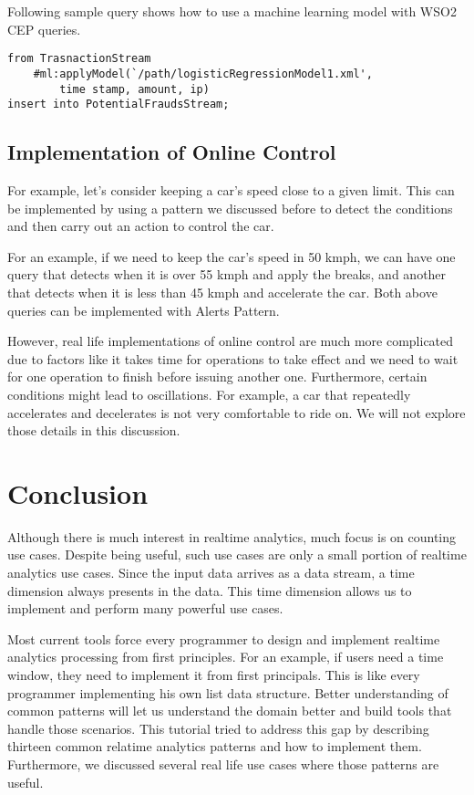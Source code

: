 \documentclass{sig-alternate}
\begin{document}
{Following sample query shows how to use a machine learning model with WSO2 CEP queries.


\begin{lstlisting}[mathescape, showstringspaces=false]
from TrasnactionStream
	#ml:applyModel(`/path/logisticRegressionModel1.xml',  
		time stamp, amount, ip) 
insert into PotentialFraudsStream;
\end{lstlisting} 

\subsection{Implementation of Online Control} 

For example, let's consider keeping a car's speed close to a given limit. This can be implemented by using a pattern we discussed before to detect the conditions and then carry out an action to control the car. 

For an example, if we need to keep the car's speed in 50 kmph, we can have one query that detects when it is over 55 kmph and apply the breaks, and another that detects when it is less than 45 kmph and accelerate the car. Both above queries can be implemented with Alerts Pattern. 

However, real life implementations of online control are much more complicated due to factors like it takes time for operations to take effect and we need to wait for one operation to finish before issuing another one. Furthermore, certain conditions might lead to oscillations. For example, a car that repeatedly accelerates and decelerates is not very comfortable to ride on. We will not explore those details in this discussion. 

\section{Conclusion} 

Although there is much interest in realtime analytics, much focus is on counting use cases. Despite being useful, such use cases are only a small portion of realtime analytics use cases. Since the input data arrives as a data stream, a time dimension always presents in the data. This time dimension allows us to implement and perform many powerful use cases.  

Most current tools force every programmer to design and implement realtime analytics processing from first principles. For an example, if users need a time window, they need to implement it from first principals.  This is like every programmer implementing his own list data structure. Better understanding of common patterns will let us understand the domain better and build tools that handle those scenarios. This tutorial tried to address this gap by describing thirteen common relatime analytics patterns and how to implement them. Furthermore, we discussed several real life use cases where those patterns are useful.


}
\end{document}
